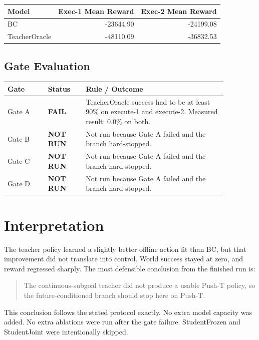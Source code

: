 \documentclass[11pt]{article}
\newcommand{\Fail}{\textcolor{red!70!black}{\textbf{FAIL}}}
\newcommand{\NA}{\textcolor{gray!80!black}{\textbf{NOT RUN}}}
\begin{document}
\begin{center}
\begin{tabular}{lrr}
\toprule
\textbf{Model} & \textbf{Exec-1 Mean Reward} & \textbf{Exec-2 Mean Reward} \\
\midrule
BC & -23644.90 & -24199.08 \\
TeacherOracle & -48110.09 & -36832.53 \\
\bottomrule
\end{tabular}
\end{center}

\subsection*{Gate Evaluation}
\begin{center}
\begin{tabular}{p{0.16\linewidth} p{0.15\linewidth} p{0.56\linewidth}}
\toprule
\textbf{Gate} & \textbf{Status} & \textbf{Rule / Outcome} \\
\midrule
Gate A & \Fail & TeacherOracle success had to be at least 90\% on execute-1 and execute-2. Measured result: 0.0\% on both. \\
Gate B & \NA & Not run because Gate A failed and the branch hard-stopped. \\
Gate C & \NA & Not run because Gate A failed and the branch hard-stopped. \\
Gate D & \NA & Not run because Gate A failed and the branch hard-stopped. \\
\bottomrule
\end{tabular}
\end{center}

\section*{Interpretation}
The teacher policy learned a slightly better offline action fit than BC, but that improvement did not translate into control. World success stayed at zero, and reward regressed sharply. The most defensible conclusion from the finished run is:

\begin{quote}
The continuous-subgoal teacher did not produce a usable Push-T policy, so the future-conditioned branch should stop here on Push-T.
\end{quote}

This conclusion follows the stated protocol exactly. No extra model capacity was added. No extra ablations were run after the gate failure. StudentFrozen and StudentJoint were intentionally skipped.
\end{document}
